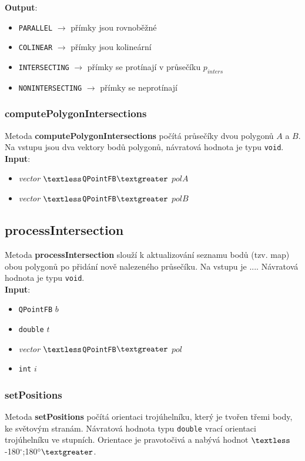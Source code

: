 \documentclass[a4paper, 12pt]{article}
\begin{document}
\textbf{Output}:
\begin{itemize}
\item \texttt{PARALLEL} $\rightarrow$ přímky jsou rovnoběžné
\item \texttt{COLINEAR} $\rightarrow$ přímky jsou kolineární
\item \texttt{INTERSECTING} $\rightarrow$ přímky se protínají v průsečíku $p_{inters}$
\item \texttt{NONINTERSECTING} $\rightarrow$ přímky se neprotínají
\end{itemize}

\subsubsection*{computePolygonIntersections}
Metoda \textbf{computePolygonIntersections} počítá průsečíky dvou polygonů $A$ a $B$. Na vstupu jsou dva vektory bodů polygonů, návratová hodnota je typu \texttt{void}.\\

\textbf{Input}:
\begin{itemize}
\item \textsl{vector} $\textless$\texttt{QPointFB}$\textgreater$ $polA$
\item \textsl{vector} $\textless$\texttt{QPointFB}$\textgreater$ $polB$
\end{itemize}

\subsection*{processIntersection}
Metoda \textbf{processIntersection} slouží k aktualizování seznamu bodů (tzv. map) obou polygonů po přidání nově nalezeného průsečíku. Na vstupu je .... Návratová hodnota je typu \texttt{void}.\\

\textbf{Input}:
\begin{itemize}
\item \texttt{QPointFB} $b$
\item \texttt{double} $t$
\item \textsl{vector} $\textless$\texttt{QPointFB}$\textgreater$ $pol$
\item \texttt{int} $i$
\end{itemize}

\subsubsection*{setPositions}
Metoda \textbf{setPositions} počítá orientaci trojúhelníku, který je tvořen třemi body, ke světovým stranám. Návratová hodnota typu \texttt{double} vrací orientaci trojúhelníku ve stupních. Orientace je pravotočivá a nabývá hodnot $\textless$-180$^\circ$;180$^\circ\textgreater$.\\
\end{document}
